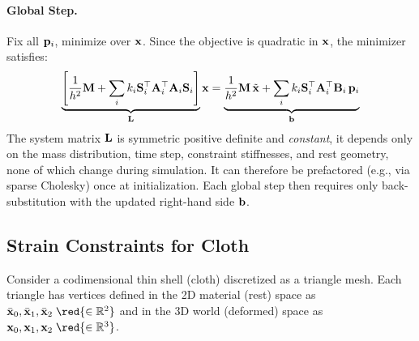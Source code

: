 \paragraph{Global Step.} Fix all $\mathbf{p}_i$, minimize over $\mathbf{x}$. Since the objective is quadratic in $\mathbf{x}$, the minimizer satisfies:
\begin{equation}
\label{eq:PD_global_step}
   \underbrace{\left[\frac{1}{h^2}\mathbf{M} + \sum_i k_i \mathbf{S}_i^\top\mathbf{A}_i^\top\mathbf{A}_i\mathbf{S}_i\right]}_{\mathbf{L}}
   \mathbf{x} =
   \underbrace{\frac{1}{h^2}\mathbf{M}\,\tilde{\mathbf{x}} + \sum_{i} k_i \mathbf{S}_i^\top\mathbf{A}_i^\top\mathbf{B}_i\,\mathbf{p}_i}_{\mathbf{b}}
\end{equation}
The system matrix $\mathbf{L}$ is symmetric positive definite and \emph{constant}, it depends only on the mass distribution, time step, constraint stiffnesses, and rest geometry, none of which change during simulation. It can therefore be prefactored (e.g., via sparse Cholesky) once at initialization. Each global step then requires only back-substitution with the updated right-hand side $\mathbf{b}$.

\subsection{Strain Constraints for Cloth}

Consider a codimensional thin shell (cloth) discretized as a triangle mesh. Each triangle has vertices defined in the 2D material (rest) space as $\bar{\x}_0, \bar{\x}_1, \bar{\x}_2\; \red{\in \RR^{2}}$ and in the 3D world (deformed) space as $\x_0, \x_1, \x_2\; \red{\in \RR^{3}}$.


